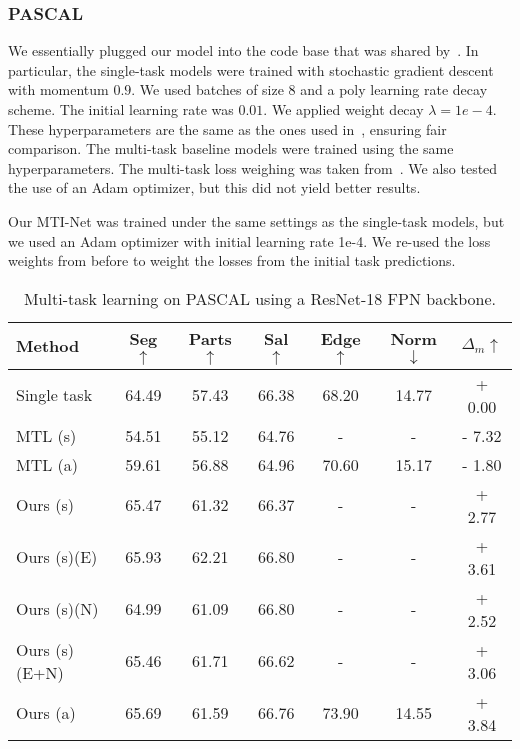 \documentclass[runningheads]{llncs}
\begin{document}
\subsubsection{PASCAL}
We essentially plugged our model into the code base that was shared by~\cite{maninis2019attentive}. In particular, the single-task models were trained with stochastic gradient descent with momentum $0.9$. We used batches of size 8 and a poly learning rate decay scheme. The initial learning rate was $0.01$. We applied weight decay $\lambda = 1e-4$. These hyperparameters are the same as the ones used in~\cite{maninis2019attentive}, ensuring fair comparison. The multi-task baseline models were trained using the same hyperparameters. The multi-task loss weighing was taken from~\cite{maninis2019attentive}. We also tested the use of an Adam optimizer, but this did not yield better results. 

Our MTI-Net was trained under the same settings as the single-task models, but we used an Adam optimizer with initial learning rate 1e-4. We re-used the loss weights from before to weight the losses from the initial task predictions.  


\begin{table}[t]
    \caption{Multi-task learning on PASCAL using a ResNet-18 FPN backbone.}
    \centering
    \label{tab: pascal_resnet18}
    \scriptsize{
    \begin{tabular}{|l|c|c|c|c|c|c|}
    \hline
    Method & Seg $\uparrow$ & Parts $\uparrow$ & Sal $\uparrow$ & Edge $\uparrow$ & Norm $\downarrow$ & $\Delta_{m} \uparrow$ \\
    \hline
    Single task & 64.49 & 57.43 & 66.38 & 68.20 & 14.77 & + 0.00 \\
    MTL (s) & 54.51 & 55.12 & 64.76 & - & - & - 7.32 \\
    MTL (a) & 59.61 & 56.88 & 64.96 & 70.60 & 15.17 & - 1.80 \\
    \hline
    Ours (s) & 65.47 & 61.32 & 66.37 & - & - & + 2.77 \\
    Ours (s)(E) & 65.93 & 62.21 & 66.80 & - & - & + 3.61 \\
    Ours (s)(N) & 64.99 & 61.09 & 66.80 & - & - & + 2.52 \\
    Ours (s)(E+N) & 65.46 & 61.71 & 66.62 & - & - & + 3.06 \\
    Ours (a) & 65.69 & 61.59 & 66.76 & 73.90 & 14.55 & + 3.84 \\
    \hline
    \end{tabular}}
  \end{table}
\end{document}
